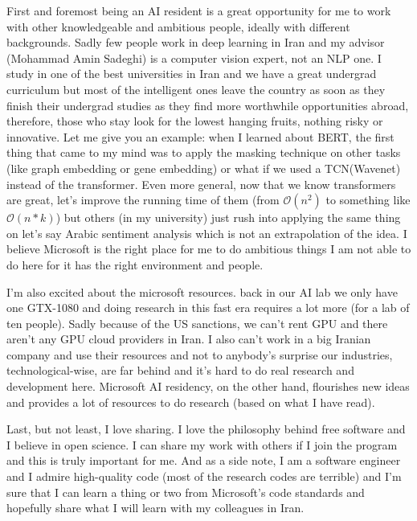 \documentclass[11pt, a4paper]{awesome-cv}
\begin{document}
\begin{cvletter}
First and foremost being an AI resident is a great opportunity for me to work with other knowledgeable and ambitious people, ideally with different backgrounds. Sadly few people work in deep learning in Iran and my advisor (Mohammad Amin Sadeghi) is a computer vision expert, not an NLP one. I study in one of the best universities in Iran and we have a great undergrad curriculum but most of the intelligent ones leave the country as soon as they finish their undergrad studies as they find more worthwhile opportunities abroad, therefore, those who stay look for the lowest hanging fruits, nothing risky or innovative. Let me give you an example: when I learned about BERT, the first thing that came to my mind was to apply the masking technique on other tasks (like graph embedding or gene embedding) or what if we used a TCN(Wavenet) instead of the transformer. Even more general, now that we know transformers are great, let’s improve the running time of them (from $\mathcal{O}(n^{2})$ to something like $\mathcal{O}(n*k)$) but others (in my university) just rush into applying the same thing on let’s say Arabic sentiment analysis which is not an extrapolation of the idea. I believe Microsoft is the right place for me to do ambitious things I am not able to do here for it has the right environment and people. 

I’m also excited about the microsoft resources. back in our AI lab we only have one GTX-1080 and doing research in this fast era requires a lot more (for a lab of ten people). Sadly because of the US sanctions, we can’t rent GPU and there aren’t any GPU cloud providers in Iran. I also can’t work in a big Iranian company and use their resources and not to anybody’s surprise our industries, technological-wise, are far behind and it’s hard to do real research and development here. Microsoft AI residency, on the other hand, flourishes new ideas and provides a lot of resources to do research (based on what I have read).

\newpage

Last, but not least, I love sharing. I love the philosophy behind free software and I believe in open science. I can share my work with others if I join the program and this is truly important for me. And as a side note, I am a software engineer and I admire high-quality code (most of the research codes are terrible) and I’m sure that I can learn a thing or two from Microsoft's code standards and hopefully share what I will learn with my colleagues in Iran.


\end{cvletter}
\end{document}
